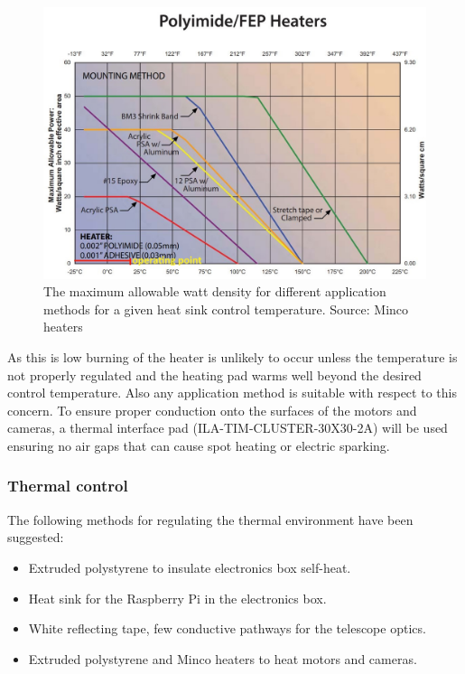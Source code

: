 	\begin{figure}[H]
    \centering
    \includegraphics[scale=0.8]{4-experiment-design/img/mechanical/wattdensity.JPG}
	\caption{The maximum allowable watt density for different application methods for a given heat sink control temperature. Source: Minco heaters}
	\label{fig:wattdensity}
	\end{figure}

As this is low burning of the heater is unlikely to occur unless the temperature is not properly regulated and the heating pad warms well beyond the desired control temperature. Also any application method is suitable with respect to this concern. To ensure proper conduction onto the surfaces of the motors and cameras, a thermal interface pad (ILA-TIM-CLUSTER-30X30-2A) will be used ensuring no air gaps that can cause spot heating or electric sparking. \\














\subsubsection{Thermal control}
The following methods for regulating the thermal environment have been suggested:

\begin{itemize}
  \item Extruded polystyrene to insulate electronics box self-heat.
  \item Heat sink for the Raspberry Pi in the electronics box.
  \item White reflecting tape, few conductive pathways for the telescope optics.
  \item Extruded polystyrene and Minco heaters to heat motors and cameras.

\end{itemize}

